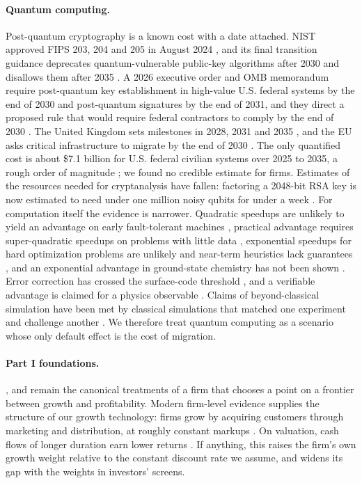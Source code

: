 \paragraph{Quantum computing.} Post-quantum cryptography is a known cost with a date attached. NIST approved FIPS 203, 204 and 205 in August 2024 \citep{nist2024modulekem,nist2024moduledsa,nist2024stateless}, and its final transition guidance deprecates quantum-vulnerable public-key algorithms after 2030 and disallows them after 2035 \citep{moody2026transition}. A 2026 executive order and OMB memorandum require post-quantum key establishment in high-value U.S. federal systems by the end of 2030 and post-quantum signatures by the end of 2031, and they direct a proposed rule that would require federal contractors to comply by the end of 2030 \citep{whitehouse2026securing,omb2026execution}. The United Kingdom sets milestones in 2028, 2031 and 2035 \citep{ncsc2025timelines}, and the EU asks critical infrastructure to migrate by the end of 2030 \citep{nis2025coordinated}. The only quantified cost is about \$7.1 billion for U.S. federal civilian systems over 2025 to 2035, a rough order of magnitude \citep{omb2024report}; we found no credible estimate for firms. Estimates of the resources needed for cryptanalysis have fallen: factoring a 2048-bit RSA key is now estimated to need under one million noisy qubits for under a week \citep{gidney2025how}. For computation itself the evidence is narrower. Quadratic speedups are unlikely to yield an advantage on early fault-tolerant machines \citep{babbush2021focus}, practical advantage requires super-quadratic speedups on problems with little data \citep{hoefler2023disentangling}, exponential speedups for hard optimization problems are unlikely and near-term heuristics lack guarantees \citep{abbas2024challenges}, and an exponential advantage in ground-state chemistry has not been shown \citep{lee2023evaluating}. Error correction has crossed the surface-code threshold \citep{google2025quantum}, and a verifiable advantage is claimed for a physics observable \citep{google2025observation}. Claims of beyond-classical simulation have been met by classical simulations that matched one experiment \citep{kim2023evidence,tindall2024efficient} and challenge another \citep{king2025beyond,mauron2025challenging}. We therefore treat quantum computing as a scenario whose only default effect is the cost of migration.

\paragraph{Part I foundations.} \citet{marris1963model}, \citet{solow1971some} and \citet{odagiri1981theory} remain the canonical treatments of a firm that chooses a point on a frontier between growth and profitability. Modern firm-level evidence supplies the structure of our growth technology: firms grow by acquiring customers through marketing and distribution, at roughly constant markups \citep{fitzgerald2024how,argente2025how,afrouzi2023concentration}. On valuation, cash flows of longer duration earn lower returns \citep{weber2018cash,gormsen2023duration}. If anything, this raises the firm's own growth weight relative to the constant discount rate we assume, and widens its gap with the weights in investors' screens.
